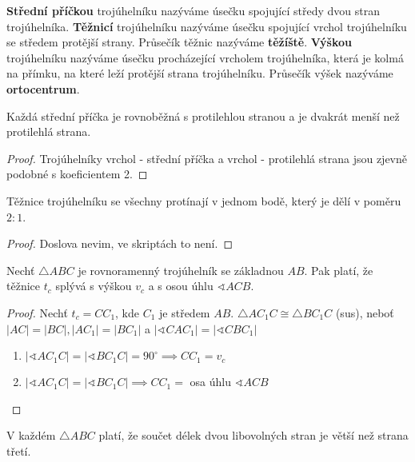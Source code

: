 \begin{definition}
  \textbf{Střední příčkou} trojúhelníku nazýváme úsečku spojující středy dvou stran trojúhelníka.
  \textbf{Těžnicí} trojúhelníku nazýváme úsečku spojující vrchol trojúhelníku se středem protější strany. Průsečík těžnic nazýváme \textbf{těžíště}.
  \textbf{Výškou} trojúhelníku nazýváme úsečku procházející vrcholem trojúhelníka, která je kolmá na přímku, na které leží protější strana trojúhelníku. Průsečík výšek nazýváme \textbf{ortocentrum}.
\end{definition}

\begin{veta}
  Každá střední příčka je rovnoběžná s protilehlou stranou a je dvakrát menší než protilehlá strana.
\end{veta}

\begin{proof}
  Trojúhelníky vrchol - střední příčka a vrchol - protilehlá strana jsou zjevně podobné s koeficientem 2.
\end{proof}

\begin{veta}
  Těžnice trojúhelníku se všechny protínají v jednom bodě, který je dělí v poměru $2:1$.
\end{veta}

\begin{proof}
  Doslova nevim, ve skriptách to není.
\end{proof}

\begin{veta}
  Nechť $\triangle ABC$ je rovnoramenný trojúhelník se základnou $AB$. Pak platí, že těžnice $t_c$ splývá s výškou $v_c$ a s osou úhlu $\sphericalangle ACB$.
\end{veta}

\begin{proof}
  Nechť $t_c = CC_1$, kde $C_1$ je středem $AB$.
  $\triangle AC_1 C \cong \triangle BC_1 C$ (sus), neboť $|AC| = |BC|, |AC_1| = |BC_1|$ a $|\sphericalangle CAC_1| = |\sphericalangle CBC_1|$
  \begin{enumerate}[$i.$]
    \item $|\sphericalangle AC_1 C| = |\sphericalangle BC_1 C| = 90^\circ \implies CC_1 = v_c$
    \item $|\sphericalangle AC_1 C| = |\sphericalangle BC_1 C| \implies CC_1 = $ osa úhlu $\sphericalangle ACB$\qedhere
  \end{enumerate}
\end{proof}

\begin{veta}
  V každém $\triangle ABC$ platí, že součet délek dvou libovolných stran je větší než strana třetí.
\end{veta}


